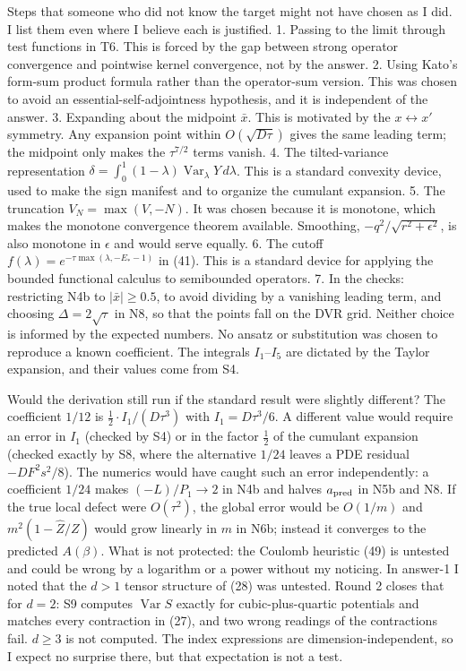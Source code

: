 \documentclass[11pt,a4paper]{article}
\begin{document}
Steps that someone who did not know the target might not have chosen as I did. I list them even where I believe each is justified.
1. Passing to the limit through test functions in T6. This is forced by the gap between strong operator convergence and pointwise kernel convergence, not by the answer.
2. Using Kato's form-sum product formula rather than the operator-sum version. This was chosen to avoid an essential-self-adjointness hypothesis, and it is independent of the answer.
3. Expanding about the midpoint \(\bar x\). This is motivated by the \(x\leftrightarrow x'\) symmetry. Any expansion point within \(O(\sqrt{D\tau})\) gives the same leading term; the midpoint only makes the \(\tau^{7/2}\) terms vanish.
4. The tilted-variance representation \(\delta=\int_0^1(1-\lambda)\operatorname{Var}_\lambda Y\,d\lambda\). This is a standard convexity device, used to make the sign manifest and to organize the cumulant expansion.
5. The truncation \(V_N=\max(V,-N)\). It was chosen because it is monotone, which makes the monotone convergence theorem available. Smoothing, \(-q^2/\sqrt{r^2+\epsilon^2}\), is also monotone in \(\epsilon\) and would serve equally.
6. The cutoff \(f(\lambda)=e^{-\tau\max(\lambda,-E_*-1)}\) in (41). This is a standard device for applying the bounded functional calculus to semibounded operators.
7. In the checks: restricting N4b to \(|\bar x|\ge0.5\), to avoid dividing by a vanishing leading term, and choosing \(\Delta=2\sqrt\tau\) in N8, so that the points fall on the DVR grid. Neither choice is informed by the expected numbers.
No ansatz or substitution was chosen to reproduce a known coefficient. The integrals \(I_1\)--\(I_5\) are dictated by the Taylor expansion, and their values come from S4.

Would the derivation still run if the standard result were slightly different? The coefficient \(1/12\) is \(\tfrac12\cdot I_1/(D\tau^3)\) with \(I_1=D\tau^3/6\). A different value would require an error in \(I_1\) (checked by S4) or in the factor \(\tfrac12\) of the cumulant expansion (checked exactly by S8, where the alternative \(1/24\) leaves a PDE residual \(-DF^2s^2/8\)). The numerics would have caught such an error independently: a coefficient \(1/24\) makes \((-L)/P_1\to2\) in N4b and halves \(a_{\rm pred}\) in N5b and N8. If the true local defect were \(O(\tau^2)\), the global error would be \(O(1/m)\) and \(m^2(1-\hat Z/Z)\) would grow linearly in \(m\) in N6b; instead it converges to the predicted \(A(\beta)\). What is not protected: the Coulomb heuristic (49) is untested and could be wrong by a logarithm or a power without my noticing. In answer-1 I noted that the \(d>1\) tensor structure of (28) was untested. Round 2 closes that for \(d=2\): S9 computes \(\operatorname{Var}S\) exactly for cubic-plus-quartic potentials and matches every contraction in (27), and two wrong readings of the contractions fail. \(d\ge3\) is not computed. The index expressions are dimension-independent, so I expect no surprise there, but that expectation is not a test.
\end{document}

